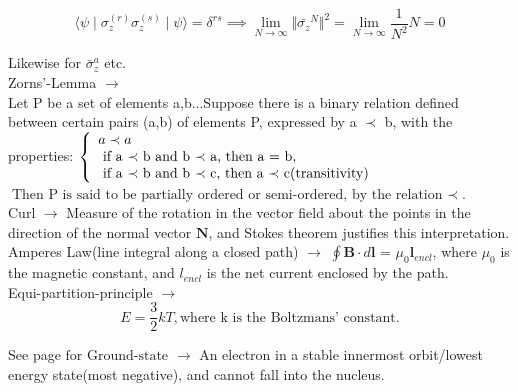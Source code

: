 \documentclass[a4paper, 10pt, onepage]{elegantbook}
\begin{document}
{\begin{equation}
\langle \psi \mid \sigma_z^{(r)} \sigma_z^{(s)} \mid \psi \rangle = \delta^{rs}
\implies \lim_{N \to \infty} \Vert \bar{\sigma_z}^{N} \Vert^2 = \lim_{N \to \infty} \frac{1}{N^2}N = 0
\end{equation}

Likewise for $\bar{\sigma}_z^a$ etc.  \\

Zorns'-Lemma $\longrightarrow$  \\

Let P be a set of elements a,b...Suppose there is a binary relation defined between certain pairs (a,b) of elements P,
expressed by a $\prec$ b, with the properties:  $\left\{
            \begin{array}{ll}
            a \prec a \\
            \text{ if a $\prec$ b and b $\prec$ a, then a = b,} \\
            \text{ if a $\prec$ b and b $\prec$ c, then a $\prec$ c(transitivity)} \\
            \end{array} \\
            \right.$  $\text{Then P is said to be partially ordered or semi-ordered, by the relation $\prec$}$.  \\

Curl $\longrightarrow$ Measure of the rotation in the vector field about the points in the direction of the normal vector $\mathbf N$, and Stokes theorem justifies this interpretation. \\
 
Amperes Law(line integral along a closed path) $\longrightarrow$ $\oint \mathbf B \cdot d \mathbf l$ = $\mu_0 \mathbf l_{encl}$, 
where $\mu_0$ is the magnetic constant, and $l_{encl}$ is the net current enclosed by the path.  \\
  
Equi-partition-principle $\longrightarrow$
\begin{equation}
E = \frac{3}{2}kT, \text{where k is the Boltzmans' constant.}
\end{equation}

See page \pageref{Sampled wave-function distribution} $\text{for Ground-state}$ $\longrightarrow$ An electron in a stable innermost orbit/lowest energy state(most negative), and cannot fall into the nucleus.  \\

}
\end{document}
